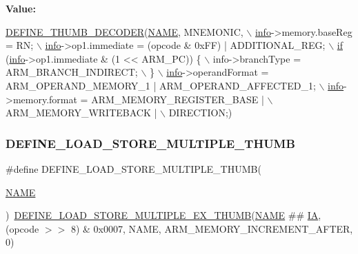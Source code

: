 {\bfseries Value\+:}
\begin{DoxyCode}
\mbox{\hyperlink{decoder-thumb_8c_a44d34ec3fd7c2c2ee51ff5966678c86e}{DEFINE\_THUMB\_DECODER}}(\mbox{\hyperlink{inflate_8h_a164ea0159d5f0b5f12a646f25f99eceaa67bc2ced260a8e43805d2480a785d312}{NAME}}, MNEMONIC, \(\backslash\)
        \mbox{\hyperlink{libretro_8h_structretro__game__info}{info}}->memory.baseReg = RN; \(\backslash\)
        \mbox{\hyperlink{libretro_8h_structretro__game__info}{info}}->op1.immediate = (opcode & 0xFF) | ADDITIONAL\_REG; \(\backslash\)
        \mbox{\hyperlink{isa-arm_8c_a0736bf8f9c6b829a423d7d7a43b781e8}{if}} (\mbox{\hyperlink{libretro_8h_structretro__game__info}{info}}->op1.immediate & (1 << ARM\_PC)) \{ \(\backslash\)
            info->branchType = ARM\_BRANCH\_INDIRECT; \(\backslash\)
        \} \(\backslash\)
        \mbox{\hyperlink{libretro_8h_structretro__game__info}{info}}->operandFormat = ARM\_OPERAND\_MEMORY\_1 | ARM\_OPERAND\_AFFECTED\_1; \(\backslash\)
        \mbox{\hyperlink{libretro_8h_structretro__game__info}{info}}->memory.format = ARM\_MEMORY\_REGISTER\_BASE | \(\backslash\)
            ARM\_MEMORY\_WRITEBACK | \(\backslash\)
            DIRECTION;)
\end{DoxyCode}
\mbox{\label{decoder-thumb_8c_a8d5163bce6b6db3dfdf601fc1a5d0e0c}} 
\subsubsection{\texorpdfstring{D\+E\+F\+I\+N\+E\+\_\+\+L\+O\+A\+D\+\_\+\+S\+T\+O\+R\+E\+\_\+\+M\+U\+L\+T\+I\+P\+L\+E\+\_\+\+T\+H\+U\+MB}{DEFINE\_LOAD\_STORE\_MULTIPLE\_THUMB}}
{\footnotesize\ttfamily \#define D\+E\+F\+I\+N\+E\+\_\+\+L\+O\+A\+D\+\_\+\+S\+T\+O\+R\+E\+\_\+\+M\+U\+L\+T\+I\+P\+L\+E\+\_\+\+T\+H\+U\+MB(\begin{DoxyParamCaption}\item[{}]{\mbox{\hyperlink{inflate_8h_a164ea0159d5f0b5f12a646f25f99eceaa67bc2ced260a8e43805d2480a785d312}{N\+A\+ME}} }\end{DoxyParamCaption})~\mbox{\hyperlink{decoder-thumb_8c_aaa81a7373807ab43c5b56789bf6628ea}{D\+E\+F\+I\+N\+E\+\_\+\+L\+O\+A\+D\+\_\+\+S\+T\+O\+R\+E\+\_\+\+M\+U\+L\+T\+I\+P\+L\+E\+\_\+\+E\+X\+\_\+\+T\+H\+U\+MB}}(\mbox{\hyperlink{inflate_8h_a164ea0159d5f0b5f12a646f25f99eceaa67bc2ced260a8e43805d2480a785d312}{N\+A\+ME}} \#\# \mbox{\hyperlink{isa-thumb_8c_a3048b70ae3e6d982e60f063bd78fda51}{IA}}, (opcode $>$$>$ 8) \& 0x0007, N\+A\+M\+E, A\+R\+M\+\_\+\+M\+E\+M\+O\+R\+Y\+\_\+\+I\+N\+C\+R\+E\+M\+E\+N\+T\+\_\+\+A\+F\+T\+E\+R, 0)}

